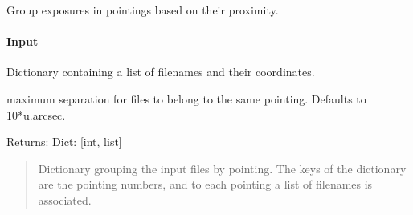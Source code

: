 \documentclass[letterpaper,10pt,english]{sphinxmanual}
\begin{document}
\begin{fulllineitems}
\label{\detokenize{api/pymusepipe:pymusepipe.util_image.group_xy_per_fieldofview}}
\pysigstartsignatures
{}
\pysigstopsignatures
\sphinxAtStartPar
Group exposures in pointings based on their proximity.


\paragraph{Input}
\label{\detokenize{api/pymusepipe:id151}}\begin{description}
\sphinxAtStartPar
Dictionary containing a list of filenames and their coordinates.

\sphinxAtStartPar
maximum separation for files to belong to the same pointing. Defaults to 10*u.arcsec.

\end{description}

\sphinxAtStartPar
Returns:
Dict: {[}int, list{]}
\begin{quote}

\sphinxAtStartPar
Dictionary grouping the input files by pointing. The keys of the dictionary are the
pointing numbers, and to each pointing a list of filenames is associated.
\end{quote}

\end{fulllineitems}

\end{document}
